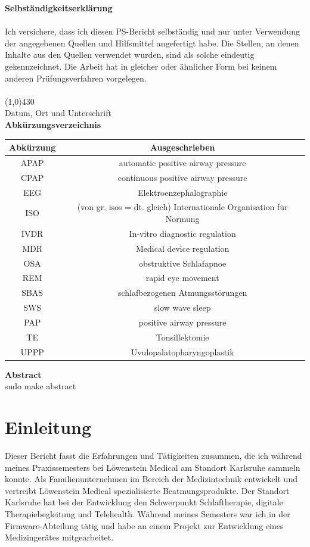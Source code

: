 \documentclass[a4paper, 12pt]{article}
\begin{document}
\newpage
{\bfseries \large Selbständigkeitserklärung}\\ \\
Ich versichere, dass ich diesen PS-Bericht selbständig und nur unter Verwendung der angegebenen
Quellen und Hilfsmittel angefertigt habe. Die Stellen, an denen Inhalte aus den Quellen verwendet
wurden, sind als solche eindeutig gekennzeichnet. Die Arbeit hat in gleicher oder ähnlicher Form bei
keinem anderen Prüfungsverfahren vorgelegen. \\
\vspace{1.0cm} \\
\line(1,0){430} \\
Datum, Ort und Unterschrift\\

\newpage
{\bfseries \large Abkürzungsverzeichnis}\\
\begin{table}[h!]
\centering
\begin{tabular}{c | c}
\hline
\textbf{Abkürzung} & \textbf{Ausgeschrieben} \\ 
\hline 
APAP & automatic positive airway pressure \\
CPAP & continuous positive airway pressure \\
EEG & Elektroenzephalographie \\
ISO & (von gr. isos = dt. gleich) Internationale Organisation für Normung \\
IVDR & In-vitro diagnostic regulation \\
MDR & Medical device regulation \\
OSA & obstruktive Schlafapnoe \\ 
REM & rapid eye movement \\
SBAS & schlafbezogenen Atmungsstörungen \\ 
SWS & slow wave sleep \\
PAP & positive airway pressure \\
TE & Tonsillektomie \\
UPPP & Uvulopalatopharyngoplastik \\
\end{tabular} 
\end{table}

\newpage
{\bfseries \large Abstract}\\
sudo make abstract 

\newpage
\tableofcontents 

\newpage
\section{Einleitung}\label{Einleitung} 
Dieser Bericht fasst die Erfahrungen und Tätigkeiten zusammen, die ich während meines Praxissemesters bei Löwenstein Medical am Standort Karlsruhe sammeln konnte. Als Familienunternehmen im Bereich der Medizintechnik entwickelt und vertreibt Löwenstein Medical spezialisierte Beatmungsprodukte. Der Standort Karlsruhe hat bei der Entwicklung den Schwerpunkt Schlaftherapie, digitale Therapiebegleitung und Telehealth. Während meines Semesters war ich in der Firmware-Abteilung tätig und habe an einem Projekt zur Entwicklung eines Medizingerätes mitgearbeitet. 
\end{document}
